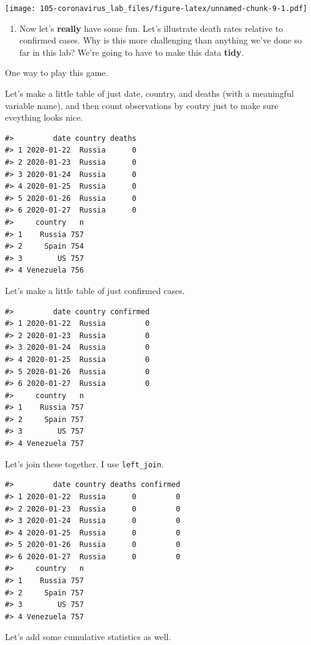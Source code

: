 \documentclass[
]{book}
\providecommand{\tightlist}{%
  \setlength{\itemsep}{0pt}\setlength{\parskip}{0pt}}
\begin{document}
\texttt{[image: 105-coronavirus\_lab\_files/figure-latex/unnamed-chunk-9-1.pdf]}

\begin{enumerate}
\def\labelenumi{\arabic{enumi}.}
\setcounter{enumi}{6}
\tightlist
\item
  Now let's \textbf{really} have some fun. Let's illustrate death rates relative to confirmed cases. Why is this more challenging than anything we've done so far in this lab? We're going to have to make this data \textbf{tidy}.
\end{enumerate}

One way to play this game.

Let's make a little table of just date, country, and deaths (with a meaningful variable name), and then count observations by coutry just to make sure eveything looks nice.

\begin{verbatim}
#>         date country deaths
#> 1 2020-01-22  Russia      0
#> 2 2020-01-23  Russia      0
#> 3 2020-01-24  Russia      0
#> 4 2020-01-25  Russia      0
#> 5 2020-01-26  Russia      0
#> 6 2020-01-27  Russia      0
#>     country   n
#> 1    Russia 757
#> 2     Spain 754
#> 3        US 757
#> 4 Venezuela 756
\end{verbatim}

Let's make a little table of just confirmed cases.

\begin{verbatim}
#>         date country confirmed
#> 1 2020-01-22  Russia         0
#> 2 2020-01-23  Russia         0
#> 3 2020-01-24  Russia         0
#> 4 2020-01-25  Russia         0
#> 5 2020-01-26  Russia         0
#> 6 2020-01-27  Russia         0
#>     country   n
#> 1    Russia 757
#> 2     Spain 757
#> 3        US 757
#> 4 Venezuela 757
\end{verbatim}

Let's join these together. I use \texttt{left\_join}.

\begin{verbatim}
#>         date country deaths confirmed
#> 1 2020-01-22  Russia      0         0
#> 2 2020-01-23  Russia      0         0
#> 3 2020-01-24  Russia      0         0
#> 4 2020-01-25  Russia      0         0
#> 5 2020-01-26  Russia      0         0
#> 6 2020-01-27  Russia      0         0
#>     country   n
#> 1    Russia 757
#> 2     Spain 757
#> 3        US 757
#> 4 Venezuela 757
\end{verbatim}

Let's add some cumulative statistics as well.
\end{document}
